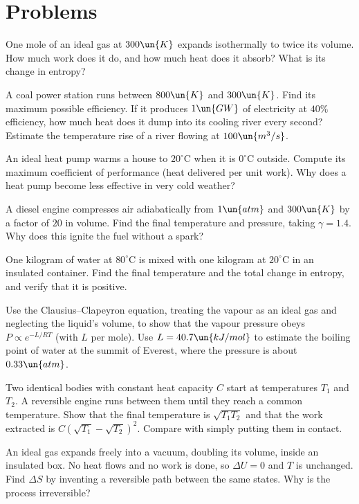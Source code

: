 \section{Problems}

\begin{problems}
 One mole of an ideal gas at $300\un{K}$ expands isothermally to twice its volume. How much work does it do, and how much heat does it absorb? What is its change in entropy?

\core A coal power station runs between $800\un{K}$ and $300\un{K}$. Find its maximum possible efficiency. If it produces $1\un{GW}$ of electricity at $40\%$ efficiency, how much heat does it dump into its cooling river every second? Estimate the temperature rise of a river flowing at $100\un{m^3/s}$.

 An ideal heat pump warms a house to $20^\circ\text{C}$ when it is $0^\circ\text{C}$ outside. Compute its maximum coefficient of performance (heat delivered per unit work). Why does a heat pump become less effective in very cold weather?

 A diesel engine compresses air adiabatically from $1\un{atm}$ and $300\un{K}$ by a factor of $20$ in volume. Find the final temperature and pressure, taking $\gamma = 1.4$. Why does this ignite the fuel without a spark?

 One kilogram of water at $80^\circ\text{C}$ is mixed with one kilogram at $20^\circ\text{C}$ in an insulated container. Find the final temperature and the total change in entropy, and verify that it is positive.

 Use the Clausius--Clapeyron equation, treating the vapour as an ideal gas and neglecting the liquid's volume, to show that the vapour pressure obeys $P\propto e^{-L/RT}$ (with $L$ per mole). Use $L = 40.7\un{kJ/mol}$ to estimate the boiling point of water at the summit of Everest, where the pressure is about $0.33\un{atm}$.

\core Two identical bodies with constant heat capacity $C$ start at temperatures $T_1$ and $T_2$. A reversible engine runs between them until they reach a common temperature. Show that the final temperature is $\sqrt{T_1T_2}$ and that the work extracted is $C(\sqrt{T_1}-\sqrt{T_2})^2$. Compare with simply putting them in contact.

 An ideal gas expands freely into a vacuum, doubling its volume, inside an insulated box. No heat flows and no work is done, so $\Delta U=0$ and $T$ is unchanged. Find $\Delta S$ by inventing a reversible path between the same states. Why is the process irreversible?


\end{problems}
